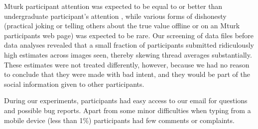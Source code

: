\documentclass[9pt,a4paper,twocolumn,lineno]{article}
\begin{document}
Mturk participant attention was expected to be equal to or better than undergraduate participant’s attention \cite{hauser2016attentive}, while various forms of dishonesty (practical joking or telling others about the true value offline or on an Mturk participants web page) was expected to be rare. Our screening of data files before data analyses revealed that a small fraction of participants submitted ridiculously high estimates across images seen, thereby skewing thread averages substantially. These estimates were not treated differently, however, because we had no reason to conclude that they were made with bad intent, and they would be part of the social information given to other participants.

During our experiments, participants had easy access to our email for questions and possible bug reports. Apart from some minor difficulties when typing from a mobile device (less than 1\%) participants had few comments or complaints.

\end{document}
